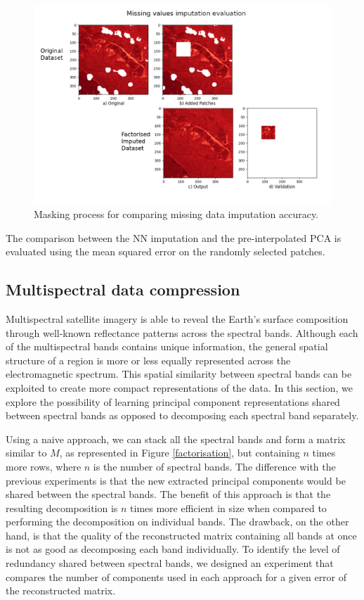 \documentclass[essd, manuscript]{copernicus}
\begin{document}
\begin{figure}%
    \includegraphics[width=14cm]{fig5.png}
    \caption{Masking process for comparing missing data imputation accuracy.}%
    \label{dataset_versions}%
\end{figure}

The comparison between the NN imputation and the pre-interpolated PCA is evaluated using the mean squared error on the randomly selected patches.

\subsection{Multispectral data compression}

Multispectral satellite imagery is able to reveal the Earth's surface composition through well-known reflectance patterns across the spectral bands. Although each of the multispectral bands contains unique information, the general spatial structure of a region is more or less equally represented across the electromagnetic spectrum. This spatial similarity between spectral bands can be exploited to create more compact representations of the data. In this section, we explore the possibility of learning principal component representations shared between spectral bands as opposed to decomposing each spectral band separately.

Using a naive approach, we can stack all the spectral bands and form a matrix similar to $M$, as represented in Figure \ref{factorisation}, but containing $n$ times more rows, where $n$ is the number of spectral bands. The difference with the previous experiments is that the new extracted principal components would be shared between the spectral bands. The benefit of this approach is that the resulting decomposition is $n$ times more efficient in size when compared to performing the decomposition on individual bands. The drawback, on the other hand, is that the quality of the reconstructed matrix containing all bands at once is not as good as decomposing each band individually. To identify the level of redundancy shared between spectral bands, we designed an experiment that compares the number of components used in each approach for a given error of the reconstructed matrix. 
\end{document}
